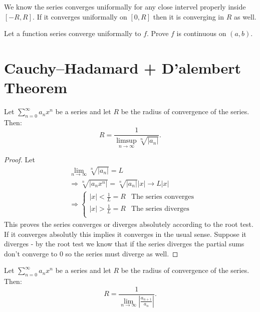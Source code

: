 \documentclass[11pt,a4paper]{article}
\begin{document}
  \begin{exercise}
    We know the series converges uniformally for any close intervel 
    properly inside $[-R,R]$.
    If it converges uniformally on $[0,R]$ then it is converging in $R$ as well.
  \end{exercise}
  \begin{exercise}
    Let a function series converge uniformally to $f$. 
    Prove $f$ is continuous on $(a,b)$.
  \end{exercise}
	
	\newpage
	
	\section{Cauchy--Hadamard + D'alembert Theorem}
  \begin{proposition}
    Let $\sum_{n=0}^{\infty} a_n x^n$ be a series and 
    let $R$ be the radius of convergence of the series.
    Then:
    \[
      R = \frac{1}{\limsup_{n\to\infty}{\sqrt[n]{|a_n|}}}.
    \]
  \end{proposition}

  \begin{proof}
    Let
    \begin{align*}
      &\lim_{n\to\infty}{\sqrt[n]{|a_n|}} = L
      \\ &\Rightarrow
      \sqrt[n]{|a_nx^n|}=\sqrt[n]{|a_n|}|x|\to L|x|
      \\ &\Rightarrow
      \begin{cases}
      |x| < \frac{1}{L} = R & \text{The series converges} \\
      |x| > \frac{1}{L} = R & \text{The series diverges} \\
      \end{cases}
    \end{align*}
    This proves the series converges or diverges absolutely according to 
    the root test. 
    If it converges absolutly this implies it converges in the usual sense. 
    Suppose it diverges - by the root test we know that 
    if the series diverges the partial sums don't converge to $0$ 
    so the series must diverge as well.
  \end{proof}

  \begin{proposition}[D'alembert]
    Let $\sum_{n=0}^{\infty} a_n x^n$ be a series and 
    let $R$ be the radius of convergence of the series.
    Then:
    \[
      R = \frac{1}{\lim_{n\to\infty}{\left|\frac{a_{n+1}}
        {a_n}\right|}}.
    \]
  \end{proposition}
\end{document}
